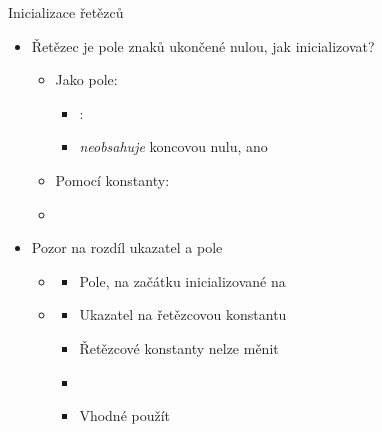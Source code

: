 \begin{frame}{Inicializace řetězců}

  \begin{itemize}
    \item Řetězec je pole znaků ukončené nulou, jak inicializovat?
    \begin{itemize}
      \item Jako pole: 

      \pause

      \begin{itemize}
	\item \pozor: 
	\item {} \emph{neobsahuje} koncovou nulu,  ano
      \end{itemize}

      \pause

      \item Pomocí konstanty: 

      \pause

      \item \footnotesize {}
    \end{itemize}

    \pause

    \item Pozor na rozdíl ukazatel a pole
    \begin{itemize}
      \item {}
      \begin{itemize}
	\item Pole, na začátku inicializované na 
      \end{itemize}

      \pause

      \item {}
      \begin{itemize}
	\item Ukazatel na řetězcovou konstantu

	\pause

	\item Řetězcové konstanty nelze měnit

	\item {}

	\pause

	\item Vhodné použít 
      \end{itemize}

    \end{itemize}

  \end{itemize}

\end{frame}

